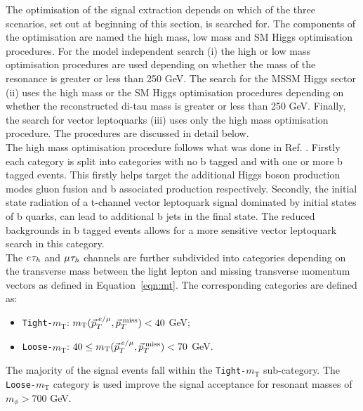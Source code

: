 The optimisation of the signal extraction depends on which of the three scenarios, set out at beginning of this section, is searched for.
The components of the optimisation are named the high mass, low mass and SM Higgs optimisation procedures.
For the model independent search (i) the high or low mass optimisation procedures are used depending on whether the mass of the resonance is greater or less than 250 GeV.
The search for the MSSM Higgs sector (ii) uses the high mass or the SM Higgs optimisation procedures depending on whether the reconstructed di-tau mass \cite{Bianchini:2014vza} is greater or less than 250 GeV.
Finally, the search for vector leptoquarks (iii) uses only the high mass optimisation procedure.
The procedures are discussed in detail below. \\

The high mass optimisation procedure follows what was done in Ref. \cite{CMS_MSSM_Tau_2018}.
Firstly each category is split into categories with no b tagged and with one or more b tagged events.
This firstly helps target the additional Higgs boson production modes gluon fusion and b associated production respectively.
Secondly, the initial state radiation of a t-channel vector leptoquark signal dominated by initial states of b quarks, can lead to additional b jets in the final state.
The reduced backgrounds in b tagged events allows for a more sensitive vector leptoquark search in this category. \\

The $e_{}\tau_{h}$ and $\mu_{}\tau_{h}$ channels are further subdivided into categories depending on the transverse mass between the light lepton and missing transverse momentum vectors as defined in Equation~\ref{eqn:mt}.
The corresponding categories are defined as:
\begin{itemize}
\item \texttt{Tight-$m_{\text{T}}$}: $m_{\text{T}}(\vec{p}_{T}^{\hspace{2pt}e/\mu},\vec{p}_{T}^{\hspace{2pt}\text{miss}}) < 40$ GeV;
\item \texttt{Loose-$m_{\text{T}}$}: $40 \leq m_{\text{T}}(\vec{p}_{T}^{\hspace{2pt}e/\mu},\vec{p}_{T}^{\hspace{2pt}\text{miss}}) < 70$ GeV.
\end{itemize}
The majority of the signal events fall within the \texttt{Tight-$m_{\text{T}}$} sub-category.
The \texttt{Loose-$m_{\text{T}}$} category is used improve the signal acceptance for resonant masses of $m_{\phi} > 700$ GeV.\\


